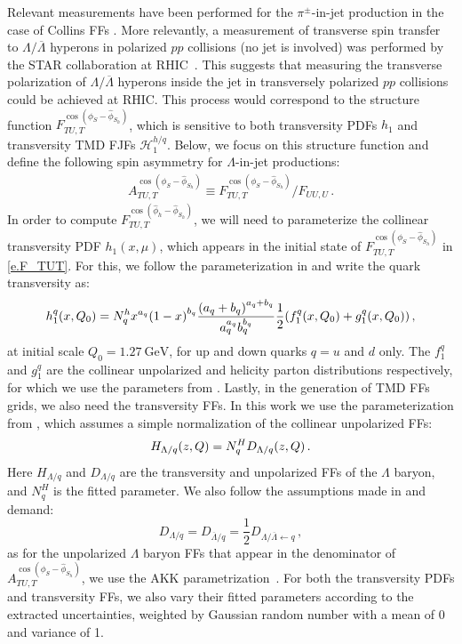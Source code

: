 \documentclass[a4paper, 11 pt]{article}
\begin{document}
Relevant measurements have been performed for the $\pi^{\pm}$-in-jet production in the case of Collins FFs \cite{STAR:2022hqg}.
More relevantly, a measurement of transverse spin transfer to $\Lambda/\overline{\Lambda}$ hyperons in polarized $pp$ collisions (no jet is involved) was performed by the STAR collaboration at RHIC~\cite{STAR:2018fqv}. This suggests that measuring the transverse polarization of $\Lambda/\overline{\Lambda}$ hyperons inside the jet in transversely polarized $pp$ collisions could be achieved at RHIC. This process would correspond to the structure function $F^{\cos(\phi _S - \hat{\phi}_{S_h})}_{TU, T}$, which is sensitive to both transversity PDFs $h_1$ and transversity TMD FJFs $\mathcal{H}_{1}^{h/q}$. Below, we focus on this structure function and define the following spin asymmetry for $\Lambda$-in-jet productions:
\begin{align}
A_{TU, T}^{\cos(\phi _S - \hat{\phi}_{S_h})}
\equiv
F_{TU, T}^{\cos(\phi _S - \hat{\phi}_{S_h})} \bigg/ F_{UU, U} \,.
\end{align}
 In order to compute $F_{TU, T}^{\cos(\hat{\phi}_h - \hat{\phi}_{S_h})}$, we will need to parameterize the collinear transversity PDF $h_1(x, \mu)$, which appears in the initial state of $F_{TU, T}^{\cos(\phi _S - \hat{\phi}_{S_h})}$ in \cref{e.F_TUT}.
For this, we follow the parameterization in \cite{Kang:2015msa} and write the quark transversity as:
\begin{equation}
h_1^q \pqty{x, Q_0}
=
N_q^h x^{a_q} \pqty{1 - x}^{b_q}
\frac{\pqty{a_q + b_q}^{a_q + b_q}}{a_q^{a_q} b_q^{b_q}}
\frac{1}{2} \pqty{f_1^q \pqty{x, Q_0} + g_1^q \pqty{x, Q_0}}
\, ,
\end{equation}
at initial scale $Q_0 = 1.27~\mathrm{GeV}$, for up and down quarks $q = u$ and $d$ only.
The $f_1^q$ and $g_1^q$ are the collinear unpolarized and helicity parton distributions respectively, for which we use the parameters from \cite{Cocuzza:2022jye}. Lastly, in the generation of TMD FFs grids, we also need the transversity FFs.
In this work we use the parameterization from \cite{Kang:2021kpt}, which assumes a simple normalization of the collinear unpolarized FFs:
\begin{equation}
\label{e.transversity_FFs_parameterization}
H_{\Lambda / q} \pqty{z, Q}
=
N_q^H D_{\Lambda / q} \pqty{z, Q}
\, .
\end{equation}
Here $H_{\Lambda / q}$ and $D_{\Lambda / q}$ are the transversity and unpolarized FFs of the $\Lambda$ baryon, and $N_q^H$ is the fitted parameter. 
We also follow the assumptions made in \cite{Callos:2020qtu, Kang:2021kpt} and demand:
\begin{equation}
D_{\Lambda / q}
=
D_{\overline{\Lambda} / q}
=
\frac{1}{2} D_{\Lambda / \overline{\Lambda} \leftarrow q}
\, ,
\end{equation}
as for the unpolarized $\Lambda$ baryon FFs that appear in the denominator of $A_{TU,T}^{\cos(\phi _S - \hat{\phi}_{S_h})}$, we use the AKK parametrization~\cite{Albino:2005mv}. For both the transversity PDFs and transversity FFs, we also vary their fitted parameters according to the extracted uncertainties, weighted by Gaussian random number with a mean of 0 and variance of 1.
\end{document}
